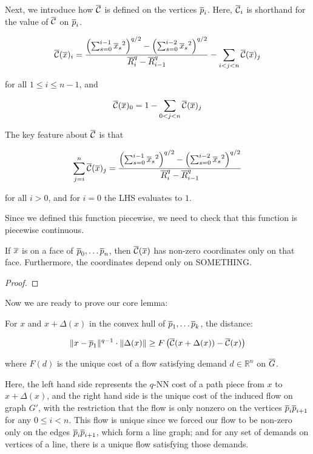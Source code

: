 Next, we introduce how $\overline{\mathcal{C}}$ is defined on the vertices $\overline{p}_{i}$. Here,
$\overline{\mathcal{C}}_i$ is shorthand for the value of $\overline{\mathcal{C}}$ on $\overline{p}_{i}$.

\begin{align}
\overline{\mathcal{C}}(\overline{x})_i = \frac{
\left(\sum_{s=0}^{i-1} {\overline{x}_s}^2\right)^{q/2} -\left(\sum_{s=0}^{i-2}
{\overline{x}_s}^2\right)^{q/2}
}
{
\overline{R}_i^q - \overline{R}_{i-1}^q
} - \sum_{i < j < n} \overline{\mathcal{C}}(\overline{x})_j
\end{align}

for all $1 \leq i \leq n-1$, and 

\[ \overline{\mathcal{C}}(\overline{x})_0 = 1 - \sum_{0 < j < n} \overline{\mathcal{C}}(\overline{x})_j
\]

The key feature about $\overline{\mathcal{C}}$ is that

\[\sum_{j=i}^n \overline{\mathcal{C}}(\overline{x})_j= \frac{
\left(\sum_{s=0}^{i-1} {\overline{x}_s}^2\right)^{q/2} -\left(\sum_{s=0}^{i-2}
{\overline{x}_s}^2\right)^{q/2}
}
{
\overline{R}_i^q - \overline{R}_{i-1}^q
}\]

for all $i > 0$, and for $i = 0$ the LHS evaluates to $1$.

Since we defined this function piecewise, we need to check that this
function is piecewise continuous.

\begin{lemma} If $\overline{x}$ is on a face of $\overline{p}_0, \ldots \overline{p}_n$, then
$\overline{\mathcal{C}}(\overline{x})$ has non-zero coordinates only on that face. Furthermore, the
coordinates depend only on SOMETHING.

\end{lemma}

\begin{proof}

\end{proof}

Now we are ready to prove our core lemma:

\begin{lemma} For $x$ and $x+\Delta(x)$ in the convex hull of $\overline{p}_1,
\ldots \overline{p}_k$, the distance:

\[ \|x-\overline{p}_1\|^{q-1} \cdot \|\Delta(x)\| \geq
F\left(\overline{\mathcal{C}}(x+\Delta(x))-\overline{\mathcal{C}}(x)\right)\]

where $F(d)$ is the unique cost of a flow satisfying demand $d \in
\mathbb{R}^n$ on $\overline{G}$.

\end{lemma}

Here, the left hand side represents the $q$-NN cost of a path piece from
$x$ to $x+\Delta(x)$, and the right hand side is the unique cost of the
induced flow on graph $G'$, with the restriction that the flow is only
nonzero on the vertices $\overline{p}_i\overline{p}_{i+1}$ for any $0 \leq i < n$. This flow
is unique since we forced our flow to be non-zero only on the edges
$\overline{p}_i\overline{p}_{i+1}$, which form a line graph; and for any set of demands on
vertices of a line, there is a unique flow satisfying those demands.

